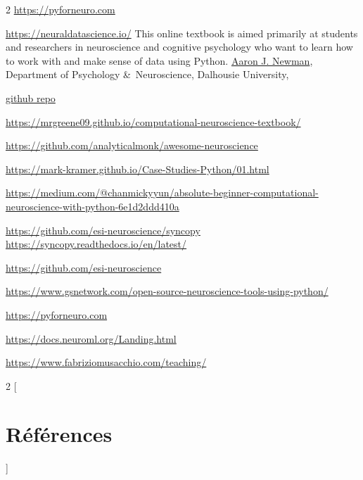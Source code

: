 \documentclass[a4paper,9pt]{extarticle}
\begin{document}
\begin{multicols}{2}
\url{https://pyforneuro.com}


\url{https://neuraldatascience.io/} This online textbook is aimed primarily at students and researchers in neuroscience and cognitive psychology who want to learn how to work with and make sense of data using Python.
\href{https://aaronjnewman.com}{Aaron J. Newman}, Department of Psychology \&\ Neuroscience, Dalhousie University, 

\href{https://github.com/neural-data-science}{github repo}



\url{https://mrgreene09.github.io/computational-neuroscience-textbook/}

\url{https://github.com/analyticalmonk/awesome-neuroscience}

\url{https://mark-kramer.github.io/Case-Studies-Python/01.html}

\url{https://medium.com/@chanmickyyun/absolute-beginner-computational-neuroscience-with-python-6e1d2ddd410a}

\url{https://github.com/esi-neuroscience/syncopy} \url{https://syncopy.readthedocs.io/en/latest/}

\url{https://github.com/esi-neuroscience}

\url{https://www.gsnetwork.com/open-source-neuroscience-tools-using-python/}

\url{https://pyforneuro.com}

\url{https://docs.neuroml.org/Landing.html}

\url{https://www.fabriziomusacchio.com/teaching/}

\end{multicols}





\begin{multicols}{2}
[
\section{Références}
]

\nocite{mullere2015a,nylen2017a,davison2009a,bruderle2009a,eppler2009a,sauer2016a,van_geit2016a,ellis2019b,viejo2023a}

\renewcommand*{\bibfont}{\small}
\printbibliography[heading=none]
\balance

\end{multicols}
\end{document}

